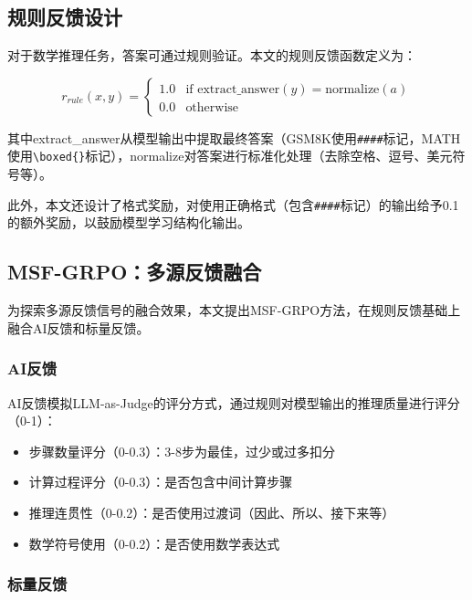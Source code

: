 \documentclass[10.5pt]{article}
\begin{document}
\subsection{规则反馈设计}

对于数学推理任务，答案可通过规则验证。本文的规则反馈函数定义为：

\begin{equation}
r_{rule}(x, y) = \begin{cases} 1.0 & \text{if extract\_answer}(y) = \text{normalize}(a) \\ 0.0 & \text{otherwise} \end{cases}
\end{equation}

其中extract\_answer从模型输出中提取最终答案（GSM8K使用\texttt{\#\#\#\#}标记，MATH使用\texttt{\textbackslash boxed\{\}}标记），normalize对答案进行标准化处理（去除空格、逗号、美元符号等）。

此外，本文还设计了格式奖励，对使用正确格式（包含\texttt{\#\#\#\#}标记）的输出给予0.1的额外奖励，以鼓励模型学习结构化输出。

\subsection{MSF-GRPO：多源反馈融合}

为探索多源反馈信号的融合效果，本文提出MSF-GRPO方法，在规则反馈基础上融合AI反馈和标量反馈。

\subsubsection{AI反馈}

AI反馈模拟LLM-as-Judge的评分方式，通过规则对模型输出的推理质量进行评分（0-1）：

\begin{itemize}[leftmargin=2em]
  \item 步骤数量评分（0-0.3）：3-8步为最佳，过少或过多扣分
  \item 计算过程评分（0-0.3）：是否包含中间计算步骤
  \item 推理连贯性（0-0.2）：是否使用过渡词（因此、所以、接下来等）
  \item 数学符号使用（0-0.2）：是否使用数学表达式
\end{itemize}

\subsubsection{标量反馈}
\end{document}
